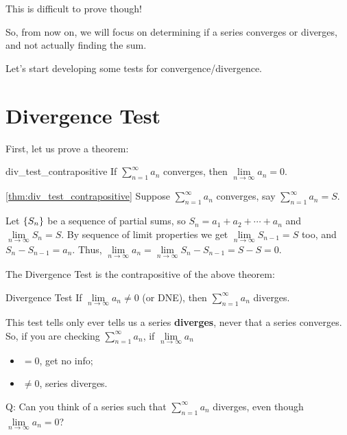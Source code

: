 This is difficult to prove though!

So, from now on, we will focus on determining
if a series converges or diverges, and not actually finding
the sum.

Let's start developing some tests for convergence/divergence.

\section{Divergence Test}
First, let us  prove a theorem:
\begin{Theorem}{}{div_test_contrapositive}
    If $ \sum\limits_{n=1}^{\infty} a_n $ converges, then $ \lim\limits_{{n} \to {\infty}} a_n=0 $.
\end{Theorem}
\begin{Proof}{\ref{thm:div_test_contrapositive}}{}
    Suppose $ \sum\limits_{n=1}^{\infty} a_n $ converges, say $ \sum\limits_{n=1}^{\infty} a_n=S $.

    Let $ \{S_n\} $ be a sequence of partial sums, so
    $ S_n=a_1+a_2+\cdots+a_n $
    and $ \lim\limits_{{n} \to {\infty}} S_n=S $. By sequence of limit properties we get
    $ \lim\limits_{{n} \to {\infty}} S_{n-1}=S $ too, and $ S_n-S_{n-1}=a_n $. Thus,
    $ \lim\limits_{{n} \to {\infty}} a_n=\lim\limits_{{n} \to {\infty}} S_{n}-S_{n-1}=S-S=0 $.
\end{Proof}

The Divergence Test is the contrapositive of the above theorem:

\begin{Theorem}{Divergence Test}{}
    If $ \lim\limits_{{n} \to {\infty}} a_n\neq 0 $ (or DNE), then
    $ \sum\limits_{n=1}^{\infty} a_n $ diverges.
\end{Theorem}

\begin{Remark}{}{}
    This test tells only ever tells us a series \textbf{diverges}, never that a series
    converges. So, if you are checking $ \sum\limits_{n=1}^{\infty} a_n $, if
    $ \lim\limits_{{n} \to {\infty}} a_n $
    \begin{itemize}
        \item $ =0 $, get no info;
        \item $ \neq 0 $, series diverges.
    \end{itemize}
\end{Remark}

Q\@: Can you think of a series such that $ \displaystyle \sum\limits_{n=1}^{\infty} a_n $ diverges,
even though $ \displaystyle \lim\limits_{{n} \to {\infty}} a_n=0 $?

